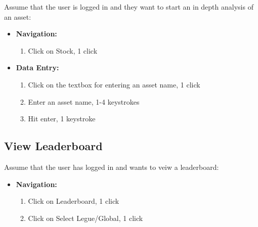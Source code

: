 Assume that the user is logged in and they want to start an in depth analysis of an asset:\\

\begin{itemize}
\item \textbf{Navigation: }
\begin{enumerate}
\item Click on Stock, 1 click
\end{enumerate}
\item \textbf{Data Entry: }
\begin{enumerate}
\item Click on the textbox for entering an asset name, 1 click
\item Enter an asset name, 1-4 keystrokes
\item Hit enter, 1 keystroke
\end{enumerate}
\end{itemize}


\subsection{View Leaderboard}

Assume that the user has logged in and wants to veiw a leaderboard:\\

\begin{itemize}
\item \textbf{Navigation: }
\begin{enumerate}
\item Click on Leaderboard, 1 click
\item Click on Select Legue/Global, 1 click
\end{enumerate}
\end{itemize}


